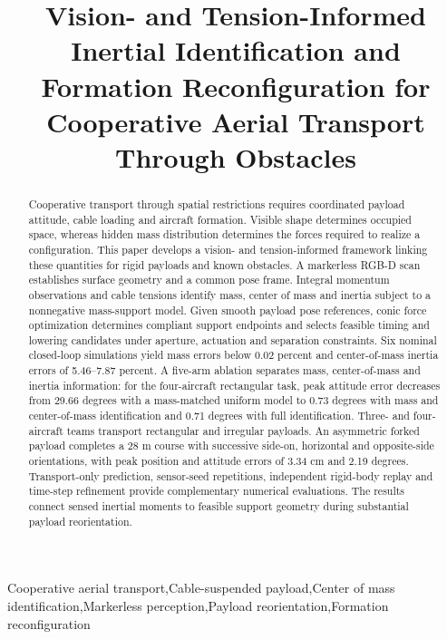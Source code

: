 \documentclass[5p,times]{elsarticle}
\begin{document}
\begin{frontmatter}
\title{Vision- and Tension-Informed Inertial Identification and Formation Reconfiguration for Cooperative Aerial Transport Through Obstacles}

\begin{abstract}
Cooperative transport through spatial restrictions requires coordinated payload attitude, cable loading and aircraft formation. Visible shape determines occupied space, whereas hidden mass distribution determines the forces required to realize a configuration. This paper develops a vision- and tension-informed framework linking these quantities for rigid payloads and known obstacles. A markerless RGB-D scan establishes surface geometry and a common pose frame. Integral momentum observations and cable tensions identify mass, center of mass and inertia subject to a nonnegative mass-support model. Given smooth payload pose references, conic force optimization determines compliant support endpoints and selects feasible timing and lowering candidates under aperture, actuation and separation constraints. Six nominal closed-loop simulations yield mass errors below 0.02 percent and center-of-mass inertia errors of 5.46--7.87 percent. A five-arm ablation separates mass, center-of-mass and inertia information: for the four-aircraft rectangular task, peak attitude error decreases from 29.66 degrees with a mass-matched uniform model to 0.73 degrees with mass and center-of-mass identification and 0.71 degrees with full identification. Three- and four-aircraft teams transport rectangular and irregular payloads. An asymmetric forked payload completes a 28 m course with successive side-on, horizontal and opposite-side orientations, with peak position and attitude errors of 3.34 cm and 2.19 degrees. Transport-only prediction, sensor-seed repetitions, independent rigid-body replay and time-step refinement provide complementary numerical evaluations. The results connect sensed inertial moments to feasible support geometry during substantial payload reorientation.
\end{abstract}
\begin{keyword}
Cooperative aerial transport\sep Cable-suspended payload\sep Center of mass identification\sep Markerless perception\sep Payload reorientation\sep Formation reconfiguration
\end{keyword}
\end{frontmatter}







\end{document}
